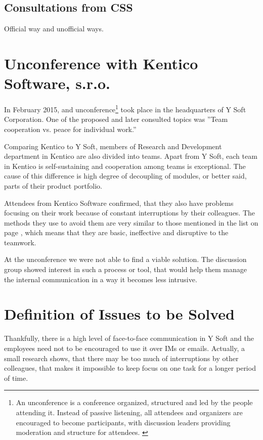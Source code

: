 \documentclass[11pt,singleside]{myfithesis2}
\begin{document}
		\subsection{Consultations from CSS}
Official way and unofficial ways.

	\section{Unconference with Kentico Software, s.r.o.}\label{Kentico}
In February 2015, and unconference\footnote{An unconference is a conference organized, structured and led by the people attending it. Instead of passive listening, all attendees and organizers are encouraged to become participants, with discussion leaders providing moderation and structure for attendees. \cite{unconference}} took place in the headquarters of Y Soft Corporation. One of the proposed and later consulted topics was ''Team cooperation vs. peace for individual work.''

Comparing Kentico to Y Soft, members of Research and Development department in Kentico are also divided into teams. Apart from Y Soft, each team in Kentico is self-sustaining and cooperation among teams is exceptional. The cause of this difference is high degree of decoupling of modules, or better said, parts of their product portfolio.

Attendees from Kentico Software confirmed, that they also have problems focusing on their work because of constant interruptions by their colleagues. The methods they use to avoid them are very similar to those mentioned in the list on page \pageref{list:avoidingCommunication}, which means that they are basic, ineffective and disruptive to the teamwork.

At the unconference we were not able to find a viable solution. The discussion group showed interest in such a process or tool, that would help them manage the internal communication in a way it becomes less intrusive.

	\section{Definition of Issues to be Solved}

Thankfully, there is a high level of face-to-face communication in Y Soft and the employees need not to be encouraged to use it over IMs or emails. Actually, a small research shows, that there may be too much of interruptions by other colleagues, that makes it impossible to keep focus on one task for a longer period of time.
\end{document}
